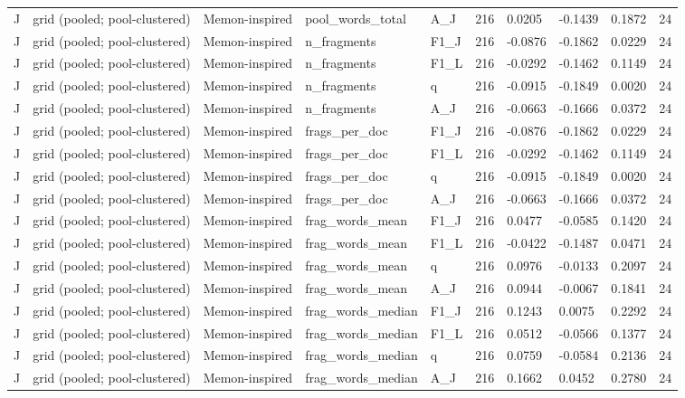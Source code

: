\begin{table}[t]
{\begin{tabular}{llllllllll}
J & grid (pooled; pool-clustered) & Memon-inspired & pool\_words\_total & A\_J & 216 & 0.0205 & -0.1439 & 0.1872 & 24 \\
J & grid (pooled; pool-clustered) & Memon-inspired & n\_fragments & F1\_J & 216 & -0.0876 & -0.1862 & 0.0229 & 24 \\
J & grid (pooled; pool-clustered) & Memon-inspired & n\_fragments & F1\_L & 216 & -0.0292 & -0.1462 & 0.1149 & 24 \\
J & grid (pooled; pool-clustered) & Memon-inspired & n\_fragments & q & 216 & -0.0915 & -0.1849 & 0.0020 & 24 \\
J & grid (pooled; pool-clustered) & Memon-inspired & n\_fragments & A\_J & 216 & -0.0663 & -0.1666 & 0.0372 & 24 \\
J & grid (pooled; pool-clustered) & Memon-inspired & frags\_per\_doc & F1\_J & 216 & -0.0876 & -0.1862 & 0.0229 & 24 \\
J & grid (pooled; pool-clustered) & Memon-inspired & frags\_per\_doc & F1\_L & 216 & -0.0292 & -0.1462 & 0.1149 & 24 \\
J & grid (pooled; pool-clustered) & Memon-inspired & frags\_per\_doc & q & 216 & -0.0915 & -0.1849 & 0.0020 & 24 \\
J & grid (pooled; pool-clustered) & Memon-inspired & frags\_per\_doc & A\_J & 216 & -0.0663 & -0.1666 & 0.0372 & 24 \\
J & grid (pooled; pool-clustered) & Memon-inspired & frag\_words\_mean & F1\_J & 216 & 0.0477 & -0.0585 & 0.1420 & 24 \\
J & grid (pooled; pool-clustered) & Memon-inspired & frag\_words\_mean & F1\_L & 216 & -0.0422 & -0.1487 & 0.0471 & 24 \\
J & grid (pooled; pool-clustered) & Memon-inspired & frag\_words\_mean & q & 216 & 0.0976 & -0.0133 & 0.2097 & 24 \\
J & grid (pooled; pool-clustered) & Memon-inspired & frag\_words\_mean & A\_J & 216 & 0.0944 & -0.0067 & 0.1841 & 24 \\
J & grid (pooled; pool-clustered) & Memon-inspired & frag\_words\_median & F1\_J & 216 & 0.1243 & 0.0075 & 0.2292 & 24 \\
J & grid (pooled; pool-clustered) & Memon-inspired & frag\_words\_median & F1\_L & 216 & 0.0512 & -0.0566 & 0.1377 & 24 \\
J & grid (pooled; pool-clustered) & Memon-inspired & frag\_words\_median & q & 216 & 0.0759 & -0.0584 & 0.2136 & 24 \\
J & grid (pooled; pool-clustered) & Memon-inspired & frag\_words\_median & A\_J & 216 & 0.1662 & 0.0452 & 0.2780 & 24 \\

\end{tabular}}
\end{table}
